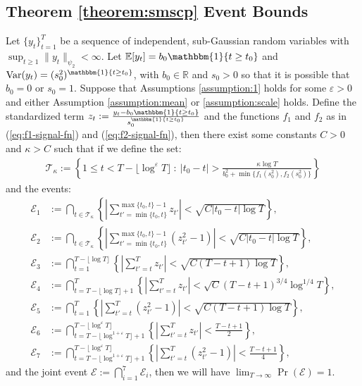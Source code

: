 \subsection{Theorem \ref{theorem:smscp} Event Bounds}

\begin{lemma}\label{lemma:thm3-event-bound}
Let $\{y_t\}_{t=1}^T$ be a sequence of independent, sub-Gaussian random variables with $\sup_{t \geq 1} \lVert y_t\rVert_{\psi_2} < \infty$. Let $\E[y_t] = b_0\mathbbm{1}\{t\geq t_0\}$ and $\normalfont{\Var}(y_t) = (s_0^2)^{\mathbbm{1}\{t\geq t_0\}}$, with $b_0 \in \mathbb{R}$ and $s_0 > 0$ so that it is possible that $b_0 = 0$ or $s_0 = 1$. Suppose that Assumptions \ref{assumption:1} holds for some $\varepsilon >0$ and either Assumption \ref{assumption:mean} or \ref{assumption:scale} holds. Define the standardized term $z_t:= \frac{y_t - b_0\mathbbm{1}\{t\geq t_0\}}{s_0^{\mathbbm{1}\{t\geq t_0\}}}$ and the functions $f_1$ and $f_2$ as in (\ref{eq:f1-signal-fn}) and (\ref{eq:f2-signal-fn}), then there exist some constants $C > 0$ and $\kappa > C$ such that if we define the set:
\begin{align*}
    \mathcal{T}_{\kappa}:= \left\{1\leq t < T - \lfloor\log^{\varepsilon} T\rfloor\::\: |t_0 - t| > \frac{\kappa\log T}{b^2_0 + \min\{f_1(s_0^2),f_2(s_0^2)\}} \right\}
\end{align*}
and the events: 
\begin{align*}
    \mathcal{E}_1 &:= \bigcap_{t \in \mathcal{T}_{\kappa}} \left\{\left|\sum_{t'=\min\{t_0,t\}}^{\max\{t_0,t\}-1} z_{t'}\right| < \sqrt{C|t_0-t|\log T}\right\}, \\
    \mathcal{E}_2 &:=  \bigcap_{t \in \mathcal{T}_{\kappa}} \left\{\left|\sum_{t'=\min\{t_0,t\}}^{\max\{t_0,t\}-1} (z_{t'}^2 - 1) \right| <  \sqrt{C|t_0-t|\log T}  \right\},  \\
    \mathcal{E}_3 &:= \bigcap_{t = 1}^{ T - \lfloor\log T\rfloor}  \left\{\left|\sum_{t'=t}^T z_{t'}\right| < \sqrt{C(T-t+1)\log T}\right\}, \\
    \mathcal{E}_4 &:= \bigcap_{t = T - \lfloor \log T\rfloor +1}^T  \left\{\left|\sum_{t'=t}^T z_{t'}\right| < \sqrt{C}(T-t+1)^{3/4}\log^{1/4} T\right\}, \\
    \mathcal{E}_5 &:= \bigcap_{t=1}^T \left\{\left|\sum_{t'=t}^T (z_{t'}^2 - 1)\right| < \sqrt{C(T-t+1)\log T}\right\}, \\
    \mathcal{E}_6 &:= \bigcap_{t = T - \lfloor\log^{1+\varepsilon} T\rfloor + 1}^{T - \lfloor\log^{\varepsilon} T\rfloor} \left\{\left|\sum_{t'=t}^T z_{t'}\right| < \frac{T-t+1}{2}\right\}, \\
    \mathcal{E}_7 &:= \bigcap_{t = T - \lfloor\log^{1+\varepsilon} T\rfloor + 1}^{T - \lfloor\log^{\varepsilon} T\rfloor}  \left\{\left|\sum_{t'=t}^T (z_{t'}^2 - 1)\right| < \frac{T-t+1}{4}\right\},
\end{align*}
and the joint event $\mathcal{E} := \bigcap_{i=1}^7 \mathcal{E}_i$, then we will have $\lim_{T\to\infty} \Pr(\mathcal{E}) = 1$. 
\end{lemma}

